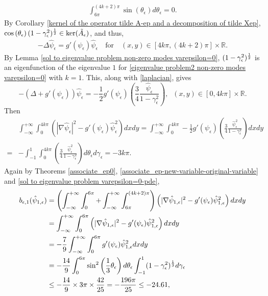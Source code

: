 \documentclass[1 [leqno, 11pt]{amsart}
\numberwithin{equation}{section}
\let\ep=\epsilon
\def\gep{\gamma_\epsilon}
\begin{document}
\begin{CJK*}{GBK}{song}
\begin{align*}
 \int_{6\pi}^{(4k+2)\pi}\sin(\theta_\ep)d\theta_\ep=0.
 \end{align*}
  By Corollary  \ref{kernel of  the operator tilde A-ep and a decomposition of tilde Xep},
 $\cos\left(\theta_\ep\right)(1-\gamma_\ep^2)^{1\over2}\in \ker(\tilde A_\ep)$,
 and thus,
 \begin{align}\label{hat-psi-4kpi-4k+2pi}
 -\Delta \hat{\psi}_\ep = g'(\psi_\ep) \hat{\psi}_\ep\quad \text{for} \quad (x,y) \in [4k\pi, (4k+2)\pi]\times \mathbb{R}.
 \end{align}
  By Lemma
\ref{sol to eigenvalue problem non-zero modes varepsilon=0}, $(1-\gamma_\ep^2)^{1\over2}$ is an
 eigenfunction of the eigenvalue $1$ for \eqref{eigenvalue problem2 non-zero modes varepsilon=0} with $k=1$. This, along with \eqref{laplacian}, gives
$$-(\Delta + g'(\psi_\ep)) \hat{\psi}_\ep = - \frac 1 2 g'(\psi_\ep) \left( \frac 3 4 \frac{\hat{\psi}_\ep}{1-\gamma_\ep^2} \right),\;\;(x,y) \in [0, 4k\pi]\times \mathbb{R}.$$
Then
\begin{align}\label{b1-odd-term1}
& \int_{-\infty}^{+\infty} \int_0^{4k\pi} \left(|\nabla \hat{\psi}_\ep|^2 - g'(\psi_\epsilon)\hat{\psi}_\ep^2\right) dx dy  = \int_{-\infty}^{+\infty} \int_0^{4k\pi} - \frac 1 2 g'(\psi_\ep) \left( \frac 3 4 \frac{\hat{\psi}_\ep^2}{1-\gamma_\ep^2} \right)dx dy \\\nonumber
= & - \int_{-1}^{1} \int_0^{4k\pi}  \left( \frac 3 4 \frac{\hat{\psi}_\ep^2}{1-\gamma_\ep^2} \right)d \theta_\ep d\gep
= -3k\pi.
\end{align}
\fi
Again by Theorems \ref{associate_ep0}, \ref{associate_ep-new-variable-original-variable} and \ref{sol to eigenvalue problem varepsilon=0-pde},
\begin{align}\nonumber
b_{\ep, 1}(\hat{\psi}_{1,\ep})
& = \left(\int_{-\infty}^{+\infty} \int_0^{6\pi}
+ \int_{-\infty}^{+\infty} \int_{6\pi}^{(4k+2)\pi}\right) \left(|\nabla \hat{\psi}_{1,\ep}|^2 - g'(\psi_\epsilon)\hat{\psi}_{1,\ep}^2\right) dx dy\\\nonumber
&=\int_{-\infty}^{+\infty} \int_0^{6\pi}
 \left(|\nabla \hat{\psi}_{1,\ep}|^2 - g'(\psi_\epsilon)\hat{\psi}_{1,\ep}^2\right) dx dy\\\nonumber
 &=-{7\over 9}\int_{-\infty}^{+\infty} \int_0^{6\pi}
  g'(\psi_\epsilon)\hat{\psi}_{1,\ep}^2 dx dy\\\nonumber
 &= -{14\over 9}\int_{0}^{6\pi}\sin^2\left({1\over 3}\theta_{\ep}\right)d\theta_\ep\int_{-1}^1(1-\gamma_\ep^2)^{1\over3}d\gamma_\ep\\\label{b-ep-1-hat-psi}
 &\leq -{14\over 9}\times 3\pi\times {42\over 25}=-{196\pi\over 25}\leq -24.61,

\end{align}
\end{CJK*}
\end{document}
